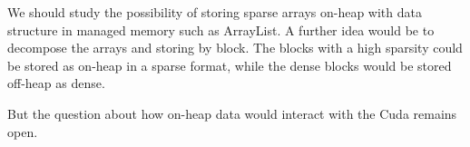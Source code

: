 We should study the possibility of storing sparse arrays on-heap with data structure in managed memory such as ArrayList. A further idea would be to decompose the arrays and storing by block. The blocks with a high sparsity could be stored as on-heap in a sparse format, while the dense blocks would be stored off-heap as dense.

But the question about how on-heap data would interact with the Cuda remains open.